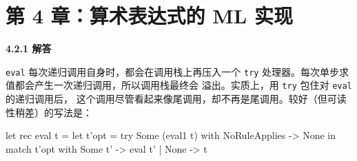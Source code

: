 \section{第 4 章：算术表达式的 ML 实现}

\begin{taplauthorsolutionentrybox}
\label{sol:author:4.2.1}
\textbf{4.2.1 解答}

\texttt{eval} 每次递归调用自身时，都会在调用栈上再压入一个
\texttt{try} 处理器。每次单步求值都会产生一次递归调用，所以调用栈最终会
溢出。实质上，用 \texttt{try} 包住对 \texttt{eval} 的递归调用后，
这个调用尽管看起来像尾调用，却不再是尾调用。较好（但可读性稍差）的写法是：

\begin{minipage}{\linewidth}
\begin{taplocamlcode}
let rec eval t =
  let t'opt =
    try Some (eval1 t) with NoRuleApplies -> None
  in
  match t'opt with
    Some t' -> eval t'
  | None -> t
\end{taplocamlcode}
\end{minipage}

\end{taplauthorsolutionentrybox}
